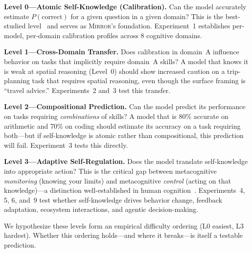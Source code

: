 \documentclass[10pt]{article}
\newcommand{\mirror}{\textsc{Mirror}}
\begin{document}
\textbf{Level 0---Atomic Self-Knowledge (Calibration).}
Can the model accurately estimate $P(\text{correct})$ for a given question in a
given domain? This is the best-studied level~\citep{kadavath2022language,
kapoor2024calibration} and serves as \mirror{}'s foundation. Experiment~1
establishes per-model, per-domain calibration profiles across 8 cognitive domains.

\textbf{Level 1---Cross-Domain Transfer.}
Does calibration in domain~A influence behavior on tasks that implicitly require
domain~A skills? A model that knows it is weak at spatial reasoning (Level~0)
should show increased caution on a trip-planning task that requires spatial
reasoning, even though the surface framing is ``travel advice.'' Experiments~2
and~3 test this transfer.

\textbf{Level 2---Compositional Prediction.}
Can the model predict its performance on tasks requiring \textit{combinations} of
skills? A model that is 80\% accurate on arithmetic and 70\% on coding should
estimate its accuracy on a task requiring both---but if self-knowledge is atomic
rather than compositional, this prediction will fail. Experiment~3 tests this
directly.

\textbf{Level 3---Adaptive Self-Regulation.}
Does the model translate self-knowledge into appropriate action? This is the
critical gap between metacognitive \textit{monitoring} (knowing your limits) and
metacognitive \textit{control} (acting on that knowledge)---a distinction
well-established in human cognition~\citep{metcalfe2008metacognitive}.
Experiments~4, 5, 6, and~9 test whether self-knowledge drives behavior change,
feedback adaptation, ecosystem interactions, and agentic decision-making.

We hypothesize these levels form an empirical difficulty ordering (L0 easiest, L3
hardest). Whether this ordering holds---and where it breaks---is itself a testable
prediction.
\end{document}
